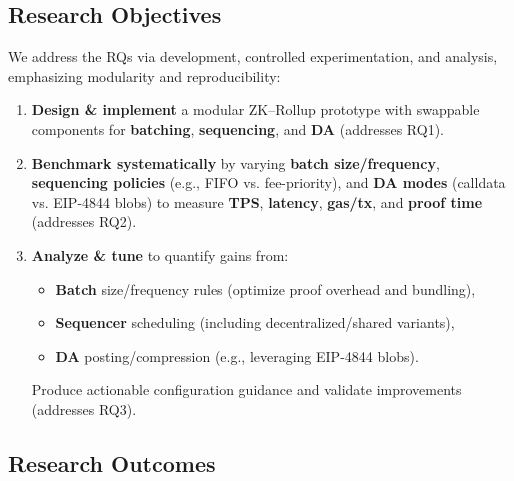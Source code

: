 \vspace{12pt}
\subsection{Research Objectives}
\vspace{12pt}

We address the RQs via development, controlled experimentation, and analysis, emphasizing modularity and reproducibility:

\begin{enumerate}
  \item \textbf{Design \& implement} a modular ZK–Rollup prototype with swappable components for \textbf{batching}, \textbf{sequencing}, and \textbf{DA} (addresses RQ1).
  \item \textbf{Benchmark systematically} by varying \textbf{batch size/frequency}, \textbf{sequencing policies} (e.g., FIFO vs. fee-priority), and \textbf{DA modes} (calldata vs. EIP-4844 blobs) to measure \textbf{TPS}, \textbf{latency}, \textbf{gas/tx}, and \textbf{proof time} (addresses RQ2).
  \item \textbf{Analyze \& tune} to quantify gains from:
    \begin{itemize}
      \item \textbf{Batch} size/frequency rules (optimize proof overhead and bundling),
      \item \textbf{Sequencer} scheduling (including decentralized/shared variants),
      \item \textbf{DA} posting/compression (e.g., leveraging EIP-4844 blobs).
    \end{itemize}
    Produce actionable configuration guidance and validate improvements (addresses RQ3).
\end{enumerate}

\subsection{Research Outcomes}
\vspace{12pt}

